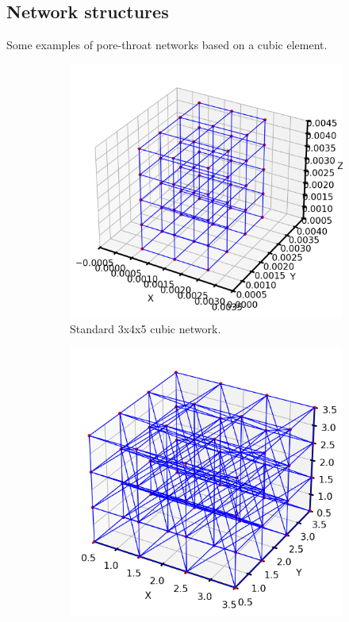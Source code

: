 \documentclass{article}
\begin{document}
\subsection{Network structures}
Some examples of pore-throat networks based on a cubic element.
\begin{figure}[htbp]
    \centering
    \begin{subfigure}[b]{0.48\textwidth}
        \centering
        \includegraphics[width=\textwidth]{images/3dStandardCubic.png}
        \caption{Standard 3x4x5 cubic network.}
    \end{subfigure}
    \hfill
    \begin{subfigure}[b]{0.48\textwidth}
        \centering
        \includegraphics[width=\textwidth]{images/3dConnectivity14.png}

\end{subfigure}
\end{figure}
\end{document}
